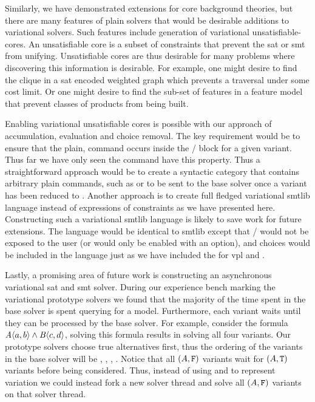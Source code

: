 Similarly, we have demonstrated extensions for core background theories, but
there are many features of plain solvers that would be desirable additions to
variational solvers. Such features include generation of variational
unsatisfiable-cores. An unsatisfiable core is a subset of constraints that
prevent the \ac{sat} or \ac{smt} from unifying. Unsatisfiable cores are thus
desirable for many problems where discovering this information is desirable. For
example, one might desire to find the clique in a \ac{sat} encoded weighted
graph which prevents a traversal under some cost limit. Or one might desire to
find the sub-set of features in a feature model that prevent classes of products
from being built.

Enabling variational unsatisfiable cores is possible with our approach of
accumulation, evaluation and choice removal. The key requirement would be to
ensure that the plain,  command occurs inside the
/ block for a given variant. Thus far we have only seen the
 command have this property. Thus a straightforward approach would
be to create a syntactic category that contains arbitrary plain commands, such
as  or  to be sent to the base solver once a
variant has been reduced to \unit{}. Another approach is to create full fledged
variational \acl{smtlib} language instead of expressions of constraints as we
have presented here. Constructing such a variational \acl{smtlib} language is
likely to save work for future extensions. The language would be identical to
\acl{smtlib} except that / would not be exposed to the user (or
would only be enabled with an option), and choices would be included in the
language just as we have included the for \ac{vpl} and \evpl{}.

Lastly, a promising area of future work is constructing an asynchronous
variational \ac{sat} and \ac{smt} solver. During our experience bench marking
the variational prototype solvers we found that the majority of the time spent
in the base solver is spent querying for a model. Furthermore, each variant
waits until they can be processed by the base solver. For example, consider the
formula $\chc[A]{a,b} \wedge{} \chc[B]{c,d}$, solving this formula results in
solving all four variants. Our prototype solvers choose true alternatives first,
thus the ordering of the variants in the base solver will be , , ,
. Notice that all $(A, \texttt{F}{})$ variants wait for
$(A, \texttt{T}{})$ variants before being considered. Thus, instead of using 
and  to represent variation we could instead fork a new solver thread
and solve all $(A, \texttt{F}{})$ variants on that solver thread.

